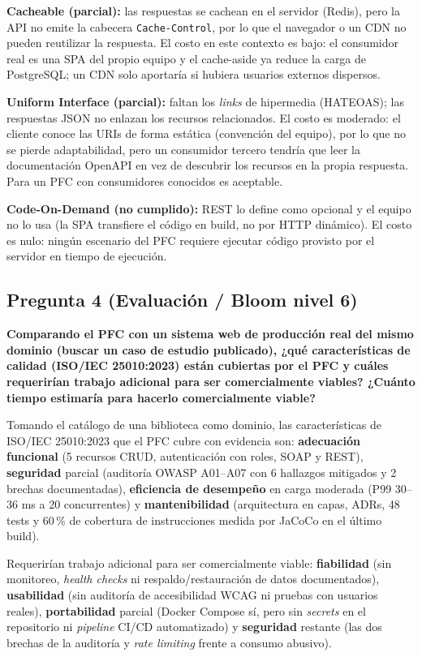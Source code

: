 \documentclass[12pt,a4paper]{article}
\begin{document}
\textbf{Cacheable (parcial):} las respuestas se cachean en el servidor (Redis), pero la
API no emite la cabecera \texttt{Cache-Control}, por lo que el navegador o un CDN no
pueden reutilizar la respuesta. El costo en este contexto es bajo: el consumidor real es
una SPA del propio equipo y el cache-aside ya reduce la carga de PostgreSQL; un CDN solo
aportaría si hubiera usuarios externos dispersos.

\textbf{Uniform Interface (parcial):} faltan los \textit{links} de hipermedia (HATEOAS);
las respuestas JSON no enlazan los recursos relacionados. El costo es moderado: el cliente
conoce las URIs de forma estática (convención del equipo), por lo que no se pierde
adaptabilidad, pero un consumidor tercero tendría que leer la documentación OpenAPI en vez
de descubrir los recursos en la propia respuesta. Para un PFC con consumidores conocidos
es aceptable.

\textbf{Code-On-Demand (no cumplido):} REST lo define como opcional y el equipo no lo usa
(la SPA transfiere el código en build, no por HTTP dinámico). El costo es nulo: ningún
escenario del PFC requiere ejecutar código provisto por el servidor en tiempo de ejecución.

\subsection*{Pregunta 4 (Evaluación / Bloom nivel 6)}

\textbf{Comparando el PFC con un sistema web de producción real del mismo dominio (buscar
un caso de estudio publicado), ¿qué características de calidad (ISO/IEC 25010:2023) están
cubiertas por el PFC y cuáles requerirían trabajo adicional para ser comercialmente
viables? ¿Cuánto tiempo estimaría para hacerlo comercialmente viable?}

Tomando el catálogo de una biblioteca como dominio, las características de ISO/IEC
25010:2023 que el PFC cubre con evidencia son: \textbf{adecuación funcional} (5 recursos
CRUD, autenticación con roles, SOAP y REST), \textbf{seguridad} parcial (auditoría OWASP
A01--A07 con 6 hallazgos mitigados y 2 brechas documentadas), \textbf{eficiencia de
desempeño} en carga moderada (P99 30--36 ms a 20 concurrentes) y \textbf{mantenibilidad}
(arquitectura en capas, ADRs, 48 tests y 60\,\% de cobertura de instrucciones medida por
JaCoCo en el último build).

Requerirían trabajo adicional para ser comercialmente viable: \textbf{fiabilidad} (sin
monitoreo, \textit{health checks} ni respaldo/restauración de datos documentados),
\textbf{usabilidad} (sin auditoría de accesibilidad WCAG ni pruebas con usuarios reales),
\textbf{portabilidad} parcial (Docker Compose sí, pero sin \textit{secrets} en el
repositorio ni \textit{pipeline} CI/CD automatizado) y \textbf{seguridad} restante (las
dos brechas de la auditoría y \textit{rate limiting} frente a consumo abusivo).
\end{document}
